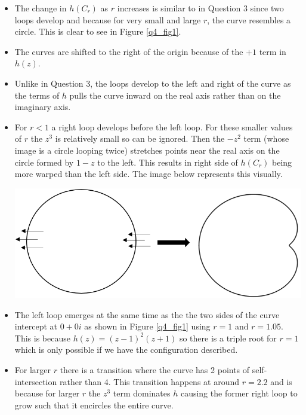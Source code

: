 \documentclass[12pt, a4paper]{article}
\begin{document}
\begin{itemize}[topsep = 8pt, leftmargin = *]
	\itemsep 0em
	\item The change in $h(C_{r})$ as $r$ increases is similar to in Question 3 since two loops develop and because for very small and large $r$, the curve resembles a circle. This is clear to see in Figure \ref{q4_fig1}.
	\item The curves are shifted to the right of the origin because of the $+1$ term in $h(z)$.
	\item Unlike in Question 3, the loops develop to the left and right of the curve as the terms of $h$ pulls the curve inward on the real axis rather than on the imaginary axis.
	\item For $r < 1$ a right loop develops before the left loop. For these smaller values of $r$ the $z^3$ is relatively small so can be ignored. %
	Then the $-z^{2}$ term (whose image is a circle looping twice) stretches points near the real axis on the circle formed by $1-z$ to the left. %
	This results in right side of $h(C_{r})$ being more warped than the left side. The image below represents this visually. \vspace{0.2cm}\\
	\begin{minipage}{\textwidth}
		\centering
		\includegraphics[width=0.5\linewidth]{q4_fig2}
		\label{q4_fig2}
	\end{minipage}
	\item The left loop emerges at the same time as the the two sides of the curve intercept at $0+0i$ as shown in Figure \ref{q4_fig1} using $r=1$ and $r=1.05$. This is because $h(z)=(z-1)^{2}(z+1)$ so there is a triple root for $r=1$ which is only possible if we have the configuration described.
	\item For larger $r$ there is a transition where the curve has 2 points of self-intersection rather than 4. This transition happens at around $r=2.2$ and is because for larger $r$ the $z^3$ term dominates $h$ causing the former right loop to grow such that it encircles the entire curve. 
\end{itemize}
\end{document}
